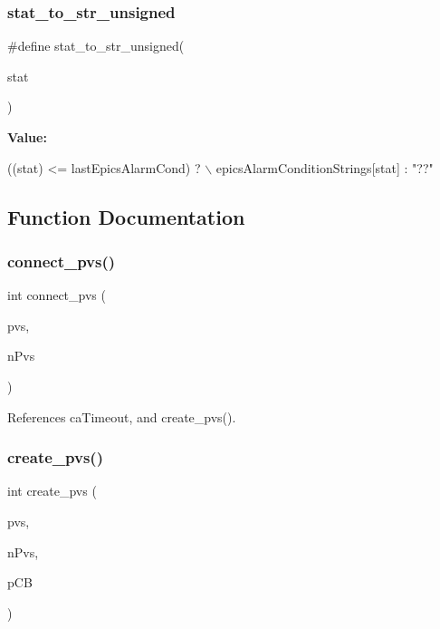 \subsubsection{stat\+\_\+to\+\_\+str\+\_\+unsigned}
{\footnotesize\ttfamily \#define stat\+\_\+to\+\_\+str\+\_\+unsigned(\begin{DoxyParamCaption}\item[{}]{stat }\end{DoxyParamCaption})}

{\bfseries Value\+:}
\begin{DoxyCode}
((stat) <= lastEpicsAlarmCond) ?        \(\backslash\)
        epicsAlarmConditionStrings[stat] : \textcolor{stringliteral}{"??"}
\end{DoxyCode}


\subsection{Function Documentation}
\mbox{\label{cuepics-world_8h_a9b5b6025321a6802e5c0e16fc5f7ce9a}} 
\subsubsection{connect\+\_\+pvs()}
{\footnotesize\ttfamily int connect\+\_\+pvs (\begin{DoxyParamCaption}\item[{\textbf{ Cu\+PV} $\ast$}]{pvs,  }\item[{int}]{n\+Pvs }\end{DoxyParamCaption})}



References ca\+Timeout, and create\+\_\+pvs().

\mbox{\label{cuepics-world_8h_a0e2d4c91a34468490cbfccf013e05ea5}} 
\subsubsection{create\+\_\+pvs()}
{\footnotesize\ttfamily int create\+\_\+pvs (\begin{DoxyParamCaption}\item[{\textbf{ Cu\+PV} $\ast$}]{pvs,  }\item[{int}]{n\+Pvs,  }\item[{ca\+Ch $\ast$}]{p\+CB }\end{DoxyParamCaption})}



